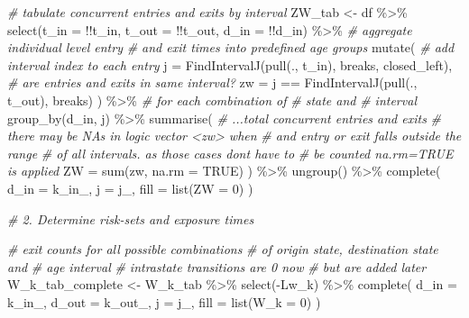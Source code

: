 \documentclass[10pt, twoside]{article}
\newenvironment{Shaded}{}{}
\newcommand{\AttributeTok}[1]{#1}
\newcommand{\CommentTok}[1]{\textit{#1}}
\newcommand{\ConstantTok}[1]{#1}
\newcommand{\DecValTok}[1]{#1}
\newcommand{\FunctionTok}[1]{#1}
\newcommand{\NormalTok}[1]{#1}
\newcommand{\OtherTok}[1]{#1}
\newcommand{\SpecialCharTok}[1]{#1}
\begin{document}
\begin{Shaded}
\begin{Highlighting}[]
  \CommentTok{\# tabulate concurrent entries and exits by interval}
\NormalTok{  ZW\_tab }\OtherTok{\textless{}{-}}
\NormalTok{    df }\SpecialCharTok{\%\textgreater{}\%}
    \FunctionTok{select}\NormalTok{(}\AttributeTok{t\_in =} \SpecialCharTok{!!}\NormalTok{t\_in, }\AttributeTok{t\_out =} \SpecialCharTok{!!}\NormalTok{t\_out, }\AttributeTok{d\_in =} \SpecialCharTok{!!}\NormalTok{d\_in) }\SpecialCharTok{\%\textgreater{}\%}
    \CommentTok{\# aggregate individual level entry}
    \CommentTok{\# and exit times into predefined age groups}
    \FunctionTok{mutate}\NormalTok{(}
      \CommentTok{\# add interval index to each entry}
      \AttributeTok{j =} \FunctionTok{FindIntervalJ}\NormalTok{(}\FunctionTok{pull}\NormalTok{(., t\_in), breaks, closed\_left),}
      \CommentTok{\# are entries and exits in same interval?}
      \AttributeTok{zw =}\NormalTok{ j }\SpecialCharTok{==} \FunctionTok{FindIntervalJ}\NormalTok{(}\FunctionTok{pull}\NormalTok{(., t\_out), breaks)}
\NormalTok{    ) }\SpecialCharTok{\%\textgreater{}\%}
    \CommentTok{\# for each combination of}
    \CommentTok{\# state and}
    \CommentTok{\# interval}
    \FunctionTok{group\_by}\NormalTok{(d\_in, j) }\SpecialCharTok{\%\textgreater{}\%}
    \FunctionTok{summarise}\NormalTok{(}
      \CommentTok{\# ...total concurrent entries and exits}
      \CommentTok{\# there may be NAs in logic vector \textless{}zw\textgreater{} when}
      \CommentTok{\# and entry or exit falls outside the range}
      \CommentTok{\# of all intervals. as those cases don\textquotesingle{}t have to}
      \CommentTok{\# be counted na.rm=TRUE is applied}
      \AttributeTok{ZW =} \FunctionTok{sum}\NormalTok{(zw, }\AttributeTok{na.rm =} \ConstantTok{TRUE}\NormalTok{)}
\NormalTok{    ) }\SpecialCharTok{\%\textgreater{}\%}
    \FunctionTok{ungroup}\NormalTok{() }\SpecialCharTok{\%\textgreater{}\%}
    \FunctionTok{complete}\NormalTok{(}
      \AttributeTok{d\_in =}\NormalTok{ k\_in\_, }\AttributeTok{j =}\NormalTok{ j\_,}
      \AttributeTok{fill =} \FunctionTok{list}\NormalTok{(}\AttributeTok{ZW =} \DecValTok{0}\NormalTok{)}
\NormalTok{    )}

  \CommentTok{\# 2. Determine risk{-}sets and exposure times}

  \CommentTok{\# exit counts for all possible combinations}
  \CommentTok{\# of origin state, destination state and}
  \CommentTok{\# age interval}
  \CommentTok{\# intrastate transitions are 0 now}
  \CommentTok{\# but are added later}
\NormalTok{  W\_k\_tab\_complete }\OtherTok{\textless{}{-}}
\NormalTok{    W\_k\_tab }\SpecialCharTok{\%\textgreater{}\%}
    \FunctionTok{select}\NormalTok{(}\SpecialCharTok{{-}}\NormalTok{Lw\_k) }\SpecialCharTok{\%\textgreater{}\%}
    \FunctionTok{complete}\NormalTok{(}
      \AttributeTok{d\_in =}\NormalTok{ k\_in\_, }\AttributeTok{d\_out =}\NormalTok{ k\_out\_, }\AttributeTok{j =}\NormalTok{ j\_,}
      \AttributeTok{fill =} \FunctionTok{list}\NormalTok{(}\AttributeTok{W\_k =} \DecValTok{0}\NormalTok{)}
\NormalTok{    )}


\end{Highlighting}
\end{Shaded}
\end{document}
